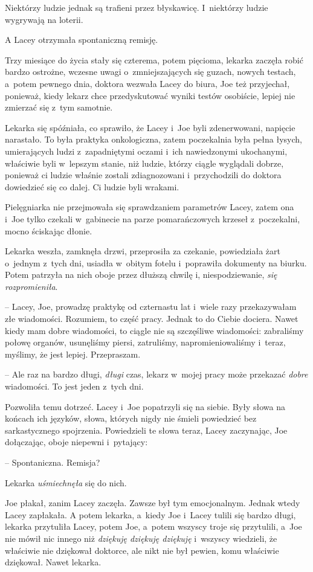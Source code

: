 \documentclass[oneside,polish,11pt,sfheadings]{mwbk}
\begin{document}
Niektórzy ludzie jednak są trafieni przez błyskawicę. I~niektórzy ludzie
wygrywają na loterii.

A Lacey otrzymała spontaniczną remisję.

Trzy miesiące do życia stały się czterema, potem pięcioma, lekarka
zaczęła robić bardzo ostrożne, wczesne uwagi o~zmniejszających się
guzach, nowych testach, a~potem pewnego dnia, doktora wezwała Lacey do
biura, Joe też przyjechał, ponieważ, kiedy lekarz chce przedyskutować
wyniki testów osobiście, lepiej nie zmierzać się z~tym samotnie.

Lekarka się spóźniała, co sprawiło, że Lacey i~Joe byli zdenerwowani,
napięcie narastało. To była praktyka onkologiczna, zatem poczekalnia
była pełna łysych, umierających ludzi z~zapadniętymi oczami i~ich
nawiedzonymi ukochanymi, właściwie byli w~lepszym stanie, niż ludzie,
którzy ciągle wyglądali dobrze, ponieważ ci ludzie właśnie zostali
zdiagnozowani i~przychodzili do doktora dowiedzieć się co dalej. Ci
ludzie byli wrakami.

Pielęgniarka nie przejmowała się sprawdzaniem parametrów Lacey, zatem
ona i~Joe tylko czekali w~gabinecie na parze pomarańczowych krzeseł z~poczekalni, mocno ściskając dłonie.

Lekarka weszła, zamknęła drzwi, przeprosiła za czekanie, powiedziała
żart o~jednym z~tych dni, usiadła w~obitym fotelu i~poprawiła dokumenty
na biurku. Potem patrzyła na nich oboje przez dłuższą chwilę i,
niespodziewanie, \textit{się rozpromieniła}.

-- Lacey, Joe, prowadzę praktykę od czternastu lat i~wiele razy
przekazywałam złe wiadomości. Rozumiem, to część pracy. Jednak to do
Ciebie dociera. Nawet kiedy mam dobre wiadomości, to ciągle nie są
szczęśliwe wiadomości: zabraliśmy połowę organów, usunęliśmy piersi,
zatruliśmy, napromieniowaliśmy i~teraz, myślimy, że jest lepiej.
Przepraszam.

-- Ale raz na bardzo długi, \textit{długi} czas, lekarz w~mojej pracy może
przekazać \textit{dobre} wiadomości. To jest jeden z~tych dni.

Pozwoliła temu dotrzeć. Lacey i~Joe popatrzyli się na siebie. Były słowa
na końcach ich języków, słowa, których nigdy nie śmieli powiedzieć bez
sarkastycznego spojrzenia. Powiedzieli te słowa teraz, Lacey zaczynając,
Joe dołączając, oboje niepewni i~pytający: 

-- Spontaniczna. Remisja?

Lekarka \textit{uśmiechnęła }się do nich.

Joe płakał, zanim Lacey zaczęła. Zawsze był tym emocjonalnym. Jednak
wtedy Lacey zapłakała. A potem lekarka, a~kiedy Joe i~Lacey tulili się
bardzo długi, lekarka przytuliła Lacey, potem Joe, a~potem wszyscy troje
się przytulili, a~Joe nie mówił nic innego niż \textit{dziękuję dziękuję
dziękuję} i~wszyscy wiedzieli, że właściwie nie dziękował doktorce, ale
nikt nie był pewien, komu właściwie dziękował. Nawet lekarka.
\end{document}
